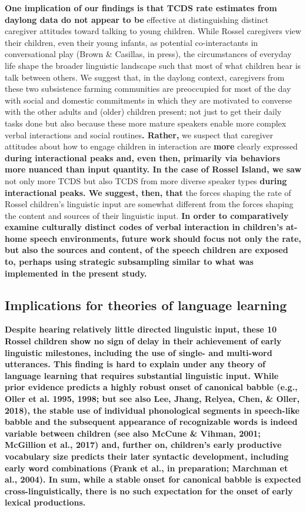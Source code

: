 \documentclass[,man,floatsintext]{apa6}
\begin{document}
\textbf{One implication of our findings is that TCDS rate estimates from
daylong data do not appear to be} effective at distinguishing distinct
caregiver attitudes toward talking to young children. While Rossel
caregivers view their children, even their young infants, as potential
co-interactants in conversational play (Brown \& Casillas, in press),
the circumstances of everyday life shape the broader linguistic
landscape such that most of what children hear is talk between others.
We suggest that, in the daylong context, caregivers from these two
subsistence farming communities are preoccupied for most of the day with
social and domestic commitments in which they are motivated to converse
with the other adults and (older) children present; not just to get
their daily tasks done but also because these more mature speakers
enable more complex verbal interactions and social routines\textbf{.
Rather,} we suspect that caregiver attitudes about how to engage
children in interaction are \textbf{more} clearly expressed
\textbf{during interactional peaks and, even then, primarily via
behaviors more nuanced than input quantity. In the case of Rossel
Island, we saw} not only more TCDS but also TCDS from more diverse
speaker types \textbf{during interactional peaks. We suggest, then,
that} the forces shaping the rate of Rossel children's linguistic input
are somewhat different from the forces shaping the content and sources
of their linguistic input. \textbf{In order to comparatively examine
culturally distinct codes of verbal interaction in children's at-home
speech environments, future work should focus not only the rate, but
also the sources and content, of the speech children are exposed to,
perhaps using strategic subsampling similar to what was implemented in
the present study.}

\subsection{\texorpdfstring{\textbf{Implications for theories of
language
learning}}{Implications for theories of language learning}}\label{implications-for-theories-of-language-learning}

\textbf{Despite hearing relatively little directed linguistic input,
these 10 Rossel children show no sign of delay in their achievement of
early linguistic milestones, including the use of single- and multi-word
utterances. This finding is hard to explain under any theory of language
learning that requires substantial linguistic input. While prior
evidence predicts a highly robust onset of canonical babble (e.g., Oller
et al. 1995, 1998; but see also Lee, Jhang, Relyea, Chen, \& Oller,
2018), the stable use of individual phonological segments in speech-like
babble and the subsequent appearance of recognizable words is indeed
variable between children (see also McCune \& Vihman, 2001; McGillion et
al., 2017) and, further on, children's early productive vocabulary size
predicts their later syntactic development, including early word
combinations (Frank et al., in preparation; Marchman et al., 2004). In
sum, while a stable onset for canonical babble is expected
cross-linguistically, there is no such expectation for the onset of
early lexical productions.}
\end{document}
